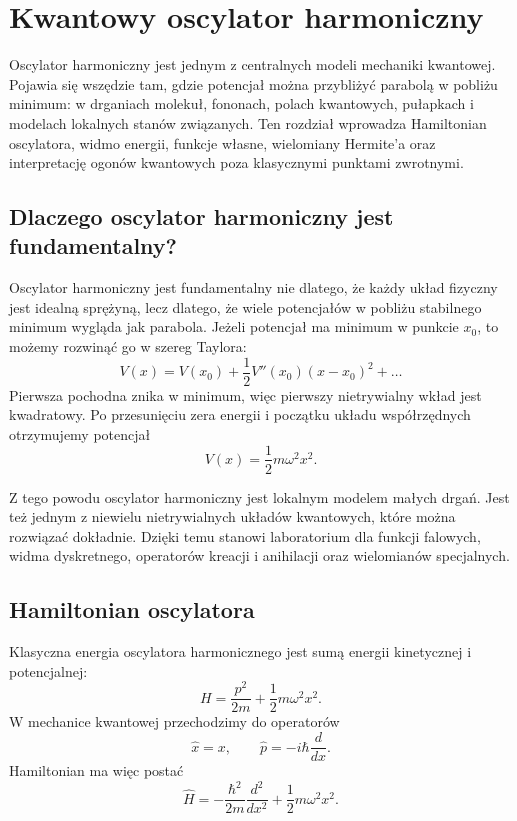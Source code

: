 \chapter{Kwantowy oscylator harmoniczny}

\begin{summarybox}
Oscylator harmoniczny jest jednym z centralnych modeli mechaniki kwantowej.
Pojawia się wszędzie tam, gdzie potencjał można przybliżyć parabolą w pobliżu
minimum: w drganiach molekuł, fononach, polach kwantowych, pułapkach i modelach
lokalnych stanów związanych. Ten rozdział wprowadza Hamiltonian oscylatora,
widmo energii, funkcje własne, wielomiany Hermite'a oraz interpretację ogonów
kwantowych poza klasycznymi punktami zwrotnymi.
\end{summarybox}

\section{Dlaczego oscylator harmoniczny jest fundamentalny?}

Oscylator harmoniczny jest fundamentalny nie dlatego, że każdy układ fizyczny jest idealną sprężyną, lecz dlatego, że wiele potencjałów w pobliżu stabilnego minimum wygląda jak parabola. Jeżeli potencjał ma minimum w punkcie \(x_0\), to możemy rozwinąć go w szereg Taylora:
\begin{equation}
    V(x)=V(x_0)+\frac{1}{2}V''(x_0)(x-x_0)^2+\ldots
\end{equation}
Pierwsza pochodna znika w minimum, więc pierwszy nietrywialny wkład jest kwadratowy. Po przesunięciu zera energii i początku układu współrzędnych otrzymujemy potencjał
\begin{equation}
    V(x)=\frac{1}{2}m\omega^2x^2.
\end{equation}

Z tego powodu oscylator harmoniczny jest lokalnym modelem małych drgań. Jest też jednym z niewielu nietrywialnych układów kwantowych, które można rozwiązać dokładnie. Dzięki temu stanowi laboratorium dla funkcji falowych, widma dyskretnego, operatorów kreacji i anihilacji oraz wielomianów specjalnych.

\section{Hamiltonian oscylatora}

Klasyczna energia oscylatora harmonicznego jest sumą energii kinetycznej i potencjalnej:
\begin{equation}
    H=\frac{p^2}{2m}+\frac{1}{2}m\omega^2x^2.
\end{equation}
W mechanice kwantowej przechodzimy do operatorów
\begin{equation}
    \hat{x}=x,
    \qquad
    \hat{p}=-i\hbar\frac{d}{dx}.
\end{equation}
Hamiltonian ma więc postać
\begin{equation}
    \hat{H}= -\frac{\hbar^2}{2m}\frac{d^2}{dx^2}+\frac{1}{2}m\omega^2x^2.
\end{equation}

